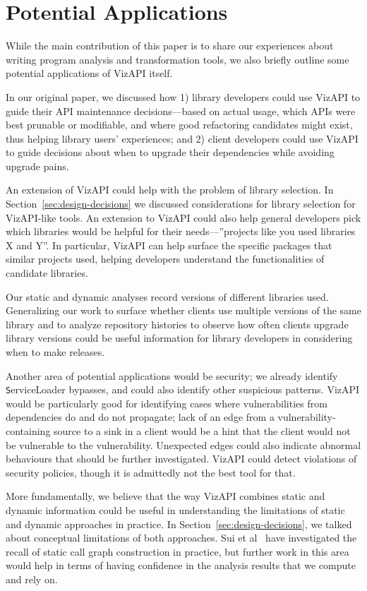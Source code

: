 \section{Potential Applications}
\label{sec:potential-applications}
While the main contribution of this paper is to share our experiences
about writing program analysis and transformation tools, we also
briefly outline some potential applications of VizAPI itself.

In our original paper, we discussed how 1) library developers could
use VizAPI to guide their API maintenance decisions---based on actual
usage, which APIs were best prunable or modifiable, and where good
refactoring candidates might exist, thus helping library users'
experiences; and 2) client developers could use VizAPI to guide
decisions about when to upgrade their dependencies while avoiding
upgrade pains.

An extension of VizAPI could help with the problem of library selection. In
Section~\ref{sec:design-decisions} we discussed considerations for library
selection for VizAPI-like tools. An extension to VizAPI could also help
general developers pick which libraries would be helpful for their
needs---''projects like you used libraries X and Y''. In particular,
VizAPI can help surface the specific packages that similar projects used,
helping developers understand the functionalities of candidate libraries.

Our static and dynamic analyses record versions of different libraries used. 
Generalizing our work to surface whether clients use multiple versions of the same library and
to analyze repository histories to observe how often clients upgrade library versions 
could be useful information for library developers in considering when to make releases.

Another area of potential applications would be security; we already
identify {\texttt ServiceLoader} bypasses, and could also identify
other suspicious patterns. VizAPI would be particularly good for
identifying cases where vulnerabilities from dependencies do and do
not propagate; lack of an edge from a vulnerability-containing source
to a sink in a client would be a hint that the client would not be
vulnerable to the vulnerability. Unexpected edges could also indicate
abnormal behaviours that should be further investigated.
VizAPI could detect violations of
security policies, though it is admittedly not the best tool for that.

More fundamentally, we believe that the way VizAPI combines static and
dynamic information could be useful in understanding the limitations
of static and dynamic approaches in practice. In
Section~\ref{sec:design-decisions}, we talked about conceptual
limitations of both approaches. Sui et
al~\cite{sui20:_recal_static_call_graph_const_pract} have investigated
the recall of static call graph construction in practice, but further
work in this area would help in terms of having confidence in the
analysis results that we compute and rely on.

